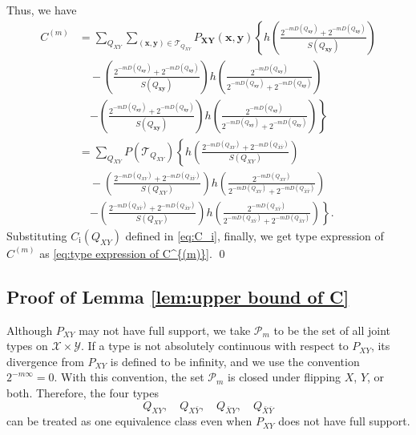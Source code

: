 \documentclass[journal,onecolumn]{IEEEtran}
\theoremstyle{definition}
\theoremstyle{remark}
\newcommand{\Dxy}{D({Q_{XY}})}
\newcommand{\Dxby}{D({Q_{X\bar{Y}}})}
\newcommand{\Dbxy}{D({Q_{\bar{X}Y}})}
\newcommand{\Dbxby}{D({Q_{\bar{X}\bar{Y}}})}
\newcommand{\Qxy}{Q_{XY}}
\newcommand{\xm}{\bm{x}}
\newcommand{\ym}{\bm{y}}
\newcommand{\Xm}{\bm{X}}
\newcommand{\Ym}{\bm{Y}}
\newcommand{\tQxy}{Q_{\xm\ym}}
\newcommand{\tQxby}{Q_{\xm\bar{\ym}}}
\newcommand{\tQbxy}{Q_{\bar{\xm}\ym}}
\newcommand{\tQbxby}{Q_{\bar{\xm}\bar{\ym}}}
\newcommand{\tDxy}{D(\tQxy)}
\newcommand{\tDxby}{D(\tQxby)}
\newcommand{\tDbxy}{D(\tQbxy)}
\newcommand{\tDbxby}{D(\tQbxby)}
\begin{document}
    Thus, we have
    \begin{align*}
        C^{(m)} &= \sum_{\Qxy}\sum_{( \xm , \ym )\in \mathcal{T}_{\Qxy}} P_{\Xm\Ym}( \xm , \ym )\left\{  h\left( \frac{2^{-m\tDxy}+2^{-m\tDbxby}}{S(\tQxy)} \right)\right.\\
        &\quad-\left(\frac{2^{-m\tDxy}+2^{-m\tDbxby}}{S(\tQxy)}\right)h\left(\frac{2^{-m\tDxy}}{2^{-m\tDxy}+2^{-m\tDbxby}}\right)\\
        &\quad\left.-\left(\frac{2^{-m\tDxby}+2^{-m\tDbxy}}{S(\tQxy)}\right)h\left(\frac{2^{-m\tDxby}}{2^{-m\tDxby}+2^{-m\tDbxy}}\right)\right\}\\
        &= \sum_{\Qxy} P(\mathcal{T}_{\Qxy}) \left\{ h\left( \frac{2^{-m\Dxy}+2^{-m\Dbxby}}{S(\Qxy)} \right)\right.\\
        &\quad-\left(\frac{2^{-m\Dxy}+2^{-m\Dbxby}}{S(\Qxy)}\right)h\left(\frac{2^{-m\Dxy}}{2^{-m\Dxy}+2^{-m\Dbxby}}\right)\\
        &\quad\left.-\left(\frac{2^{-m\Dxby}+2^{-m\Dbxy}}{S(\Qxy)}\right)h\left(\frac{2^{-m\Dxby}}{2^{-m\Dxby}+2^{-m\Dbxy}}\right)\right\}.
    \end{align*}
    Substituting $C_{\mathrm{i}}(\Qxy)$ defined in \eqref{eq:C_i}, finally, we get type expression of $C^{(m)}$ as \eqref{eq:type expression of C^{(m)}}.
    \qed









    \subsection{Proof of Lemma \ref{lem:upper bound of C}}\label{prf:upper bound of C}
    Although $P_{XY}$ may not have full support, we take
    $\mathcal{P}_m$ to be the set of all joint types on
    $\mathcal{X}\times\mathcal{Y}$.  If a type is not absolutely
    continuous with respect to $P_{XY}$, its divergence from
    $P_{XY}$ is defined to be infinity, and we use the convention
    $2^{-m\infty}=0$.  With this convention, the set
    $\mathcal{P}_m$ is closed under flipping $X$, $Y$, or both.
    Therefore, the four types
    \[
        Q_{XY},\quad Q_{X\bar Y},\quad Q_{\bar X Y},\quad
        Q_{\bar X\bar Y}
    \]
    can be treated as one equivalence class even when $P_{XY}$ does
    not have full support.
\end{document}

